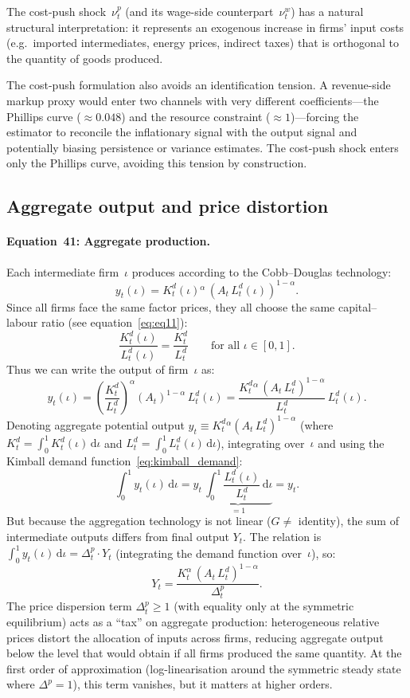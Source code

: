 \documentclass[11pt,a4paper]{article}
\newcommand{\dd}{\mathrm{d}}
\begin{document}
The cost-push shock~$\nu^p_t$ (and its wage-side
counterpart~$\nu^w_t$) has a natural structural interpretation: it
represents an exogenous increase in firms' input costs (e.g.\ imported
intermediates, energy prices, indirect taxes) that is orthogonal to
the quantity of goods produced.

\medskip\noindent
The cost-push formulation also avoids an identification tension. A
revenue-side markup proxy would enter two channels with very different
coefficients---the Phillips curve ($\approx 0.048$) and the resource
constraint ($\approx 1$)---forcing the estimator to reconcile the
inflationary signal with the output signal and potentially biasing
persistence or variance estimates.  The cost-push shock enters only the
Phillips curve, avoiding this tension by construction.

\subsection{Aggregate output and price distortion}

\paragraph{Equation~41: Aggregate production.}
Each intermediate firm~$\iota$ produces according to the Cobb--Douglas
technology:
\[
  y_t(\iota) = K^d_t(\iota){}^\alpha\,(A_t\,L^d_t(\iota))^{1-\alpha}.
\]
Since all firms face the same factor prices, they all choose the same
capital--labour ratio (see equation~\eqref{eq:eq11}):
\[
  \frac{K^d_t(\iota)}{L^d_t(\iota)} = \frac{K^d_t}{L^d_t}
  \qquad\text{for all }\iota\in[0,1].
\]
Thus we can write the output of firm~$\iota$ as:
\[
  y_t(\iota)
  = \left(\frac{K^d_t}{L^d_t}\right)^{\!\alpha}
    (A_t)^{1-\alpha}\,L^d_t(\iota)
  = \frac{K^d_t{}^\alpha\,(A_t\,L^d_t)^{1-\alpha}}{L^d_t}\,L^d_t(\iota).
\]
Denoting aggregate potential output $y_t \equiv K^d_t{}^\alpha
(A_t\,L^d_t)^{1-\alpha}$ (where $K^d_t = \int_0^1
K^d_t(\iota)\,\dd\iota$ and $L^d_t = \int_0^1
L^d_t(\iota)\,\dd\iota$), integrating over~$\iota$ and using the
Kimball demand function~\eqref{eq:kimball_demand}:
\[
  \int_0^1 y_t(\iota)\,\dd\iota
  = y_t\,\underbrace{\int_0^1
    \frac{L^d_t(\iota)}{L^d_t}\,\dd\iota}_{=1}
  = y_t.
\]
But because the aggregation technology is not linear ($G\neq$
identity), the sum of intermediate outputs differs from final output
$Y_t$. The relation is $\int_0^1 y_t(\iota)\,\dd\iota = \Delta^p_t
\cdot Y_t$ (integrating the demand function over~$\iota$), so:
\begin{equation}\label{eq:eq41}\tag{Eq.~41}
  \boxed{
  Y_t = \frac{K_t^{\alpha}\,(A_t\,L^d_t)^{1-\alpha}}{\Delta^p_t}.}
\end{equation}
The price dispersion term $\Delta^p_t \geq 1$ (with equality only at
the symmetric equilibrium) acts as a ``tax'' on aggregate production:
heterogeneous relative prices distort the allocation of inputs across
firms, reducing aggregate output below the level that would obtain if
all firms produced the same quantity. At the first order of
approximation (log-linearisation around the symmetric steady state
where $\Delta^p=1$), this term vanishes, but it matters at higher
orders.
\end{document}
